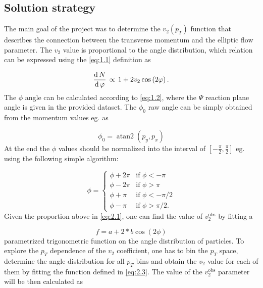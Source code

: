 \subsection{Solution strategy} \label{subsec:2.2}
The main goal of the project was to determine the $v_{2} \left( p_{T} \right)$ function that describes the connection between the transverse momentum and the elliptic flow parameter. The $v_{2}$ value is proportional to the angle distribution, which relation can be expressed using the \eqref{eq:1.1} definition as

\begin{equation} \label{eq:2.1}
	\frac{\operatorname{d}{N}}{\operatorname{d}{\varphi}}
	\,\propto\,
	1 + 2 v_{2} \cos \left( 2 \varphi \right).
\end{equation}
The $\phi$ angle can be calculated according to \eqref{eq:1.2}, where the $\Psi$ reaction plane angle is given in the provided dataset. The $\phi_{0}$ raw angle can be simply obtained from the momentum values eg. as

\begin{equation} \label{eq:2.2}
	\phi_{0}
	=
	\operatorname{atan2} \left( p_{y}, p_{x} \right)
\end{equation}
At the end the $\phi$ values should be normalized into the interval of $\left[ -\frac{\pi}{2}, \frac{\pi}{2} \right]$ eg. using the following simple algorithm:

\begin{equation}
	\phi
	=
	\begin{cases}
		\phi + 2 \pi & \text{if } \phi < -\pi \\
		\phi - 2 \pi & \text{if } \phi > \pi \\
		\phi + \pi & \text{if } \phi < -\pi/2 \\
		\phi - \pi & \text{if } \phi > \pi/2.
	\end{cases}
\end{equation}
Given the proportion above in \eqref{eq:2.1}, one can find the value of $v_{2}^{\mathrm{obs}}$ by fitting a

\begin{equation} \label{eq:2.3}
	f
	=	
	a + 2 * b \cos \left( 2 \phi \right)
\end{equation}
parametrized trigonometric function on the angle distribution of particles. To explore the $p_{T}$ dependence of the $v_{2}$ coefficient, one has to bin the $p_{T}$ space, determine the angle distribution for all $p_{T}$ bins and obtain the $v_{2}$ value for each of them by fitting the function defined in \eqref{eq:2.3}. The value of the $v_{2}^{\mathrm{obs}}$ parameter will be then calculated as

